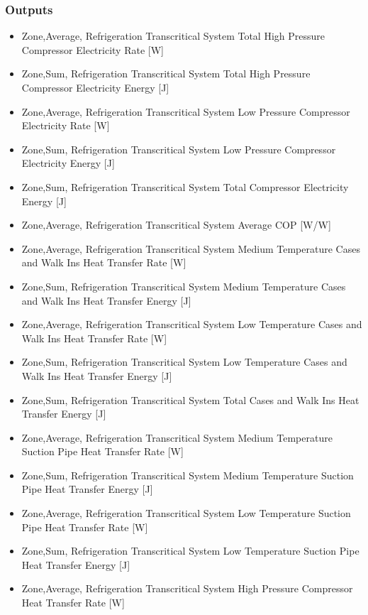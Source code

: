 \subsubsection{Outputs}\label{outputs-3-016}

\begin{itemize}
\item
  Zone,Average, Refrigeration Transcritical System Total High Pressure Compressor Electricity Rate {[}W{]}
\item
  Zone,Sum, Refrigeration Transcritical System Total High Pressure Compressor Electricity Energy {[}J{]}
\item
  Zone,Average, Refrigeration Transcritical System Low Pressure Compressor Electricity Rate {[}W{]}
\item
  Zone,Sum, Refrigeration Transcritical System Low Pressure Compressor Electricity Energy {[}J{]}
\item
  Zone,Sum, Refrigeration Transcritical System Total Compressor Electricity Energy {[}J{]}
\item
  Zone,Average, Refrigeration Transcritical System Average COP {[}W/W{]}
\item
  Zone,Average, Refrigeration Transcritical System Medium Temperature Cases and Walk Ins Heat Transfer Rate {[}W{]}
\item
  Zone,Sum, Refrigeration Transcritical System Medium Temperature Cases and Walk Ins Heat Transfer Energy {[}J{]}
\item
  Zone,Average, Refrigeration Transcritical System Low Temperature Cases and Walk Ins Heat Transfer Rate {[}W{]}
\item
  Zone,Sum, Refrigeration Transcritical System Low Temperature Cases and Walk Ins Heat Transfer Energy {[}J{]}
\item
  Zone,Sum, Refrigeration Transcritical System Total Cases and Walk Ins Heat Transfer Energy {[}J{]}
\item
  Zone,Average, Refrigeration Transcritical System Medium Temperature Suction Pipe Heat Transfer Rate {[}W{]}
\item
  Zone,Sum, Refrigeration Transcritical System Medium Temperature Suction Pipe Heat Transfer Energy {[}J{]}
\item
  Zone,Average, Refrigeration Transcritical System Low Temperature Suction Pipe Heat Transfer Rate {[}W{]}
\item
  Zone,Sum, Refrigeration Transcritical System Low Temperature Suction Pipe Heat Transfer Energy {[}J{]}
\item
  Zone,Average, Refrigeration Transcritical System High Pressure Compressor Heat Transfer Rate {[}W{]}

\end{itemize}
